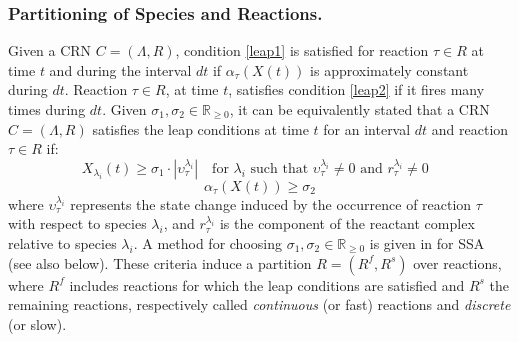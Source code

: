 \documentclass{llncs}
\begin{document}
\subsubsection{Partitioning of Species and Reactions.}\label{Partition}
Given a CRN $C=(\Lambda,R)$, condition \eqref{leap1} is satisfied for reaction $\tau \in R$ at time $t$ and during the interval $dt$ if $\alpha_{\tau}(X(t))$ is approximately constant during $dt$.
Reaction $\tau \in R$, at time $t$, satisfies condition \eqref{leap2} if it fires many times during $dt$. 
Given $\sigma_1,\sigma_2 \in \mathbb{R}_{\geq 0}$, %
it can be equivalently stated that a CRN $C=(\Lambda,R)$ satisfies the leap conditions at time $t$ for an interval $dt$ and reaction $\tau \in R$ if:
\begin{equation}\label{leapC1}
X_{\lambda_i}(t)\geq \sigma_1\cdot |\upsilon_{\tau}^{\lambda_i}| \,\,\,\,\,\, \text{for $\lambda_i$ such that $\upsilon_{\tau}^{\lambda_i} \neq 0$ and $r_{\tau}^{\lambda_i}\neq 0$ }
\end{equation}
\begin{equation}\label{leapC2}
\alpha_{\tau}(X(t))\geq \sigma_2 
\end{equation}
where %
$\upsilon_{\tau}^{\lambda_i}$ represents the state change induced by the occurrence of reaction $\tau$ with respect to species $\lambda_i$, and $r_{\tau}^{\lambda_i}$ is the component of the reactant complex relative to species $\lambda_i$.
A method for choosing $\sigma_1,\sigma_2 \in \mathbb{R}_{\geq 0}$ is given in \cite{salis2005accurate} for SSA (see also below).
These criteria induce a partition $R=(R^f,R^s)$ over reactions,
where $R^f$ includes reactions for which the leap conditions are satisfied and $R^s$ the remaining reactions, respectively called \emph{continuous} (or fast) reactions and \emph{discrete} (or slow).
\end{document}
